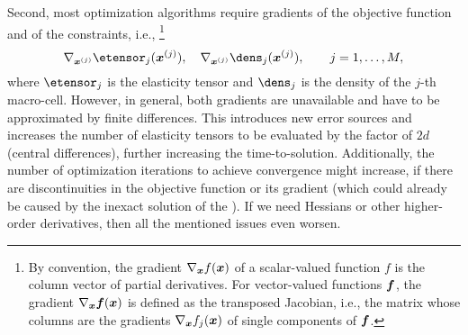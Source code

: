 Second, most optimization algorithms require gradients of the
objective function and of the constraints, i.e.,%
\footnote{%
  By convention, the gradient $\nabla_{{\boldsymbol{x}}} f({\boldsymbol{x}})$ of a
  scalar-valued function $f$ is the column vector of partial derivatives.
  For vector-valued functions ${\boldsymbol{f}}$, the gradient $\nabla_{{\boldsymbol{x}}} {\boldsymbol{f}}({\boldsymbol{x}})$
  is defined as the transposed Jacobian, i.e., the matrix whose columns
  are the gradients $\nabla_{{\boldsymbol{x}}} f_j({\boldsymbol{x}})$ of single components of
  ${\boldsymbol{f}}$.%
}
\begin{equation}
  \nabla_{\*x^{(j)}} \etensor_j(\*x^{(j)}),\quad
  \nabla_{\*x^{(j)}} \dens_j(\*x^{(j)}),\qquad
  j = 1, \dotsc, M,
\end{equation}
where $\etensor_j$ is the elasticity tensor and
$\dens_j$ is the density of the $j$-th macro-cell.
However, in general, both gradients are unavailable and
have to be approximated by finite differences.
This introduces new error sources and
increases the number of elasticity tensors to be evaluated
by the factor of $2d$ (central differences),
further increasing the time-to-solution.
Additionally, the number of optimization iterations to
achieve convergence might increase,
if there are discontinuities in the objective function
or its gradient
(which could already be caused by the inexact solution of the \fem).
If we need Hessians or other higher-order derivatives,
then all the mentioned issues even worsen.
